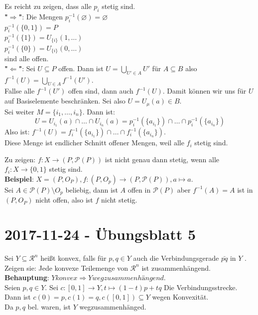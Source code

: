\begin{problem*}[3a]
Es reicht zu zeigen, dass alle $p_i$ stetig sind.\\
\textbf{"$\Rightarrow$"}: Die Mengen $p_i^{-1}(\varnothing) = \varnothing$\\
 $ p_i^{-1}( \{ 0,1 \}) = P$\\
$p_i^{-1}(\{ 1 \}) = U_{\{ i \}}(1,\dots)$\\ 
$ p_i^{-1}(\{ 0 \}) = U_{\{ i \}}(0,\dots)$\\
sind alle offen.\\
\textbf{"$\Leftarrow$"}: Sei $ U \subseteq P$ offen. Dann ist $U = \bigcup_{ U' \in A }U'$ für $ A \subseteq B$ also $f^{-1}(U) = \bigcup_{U \in A} f^{-1}(U')$. \\
Fallse alle $f^{-1}(U')$ offen sind, dann auch $ f^{-1}(U) $. Damit können wir uns für $U$ auf Basiselemente beschränken. Sei also $ U = U_\mu(a) \in B$.\\
Sei weiter $M = \{ i_1, \dots,i_n \}$. Dann ist:
\begin{equation*}
    U = U_{i_1}(a)\cap \dots \cap U_{i_n}(a) = p_i^{-1}(\{ a_{i_1} \}) \cap \dots \cap p_i^{-1}(\{ a_{i_n} \})
\end{equation*}
Also ist: $f^{-1}(U) = f_i^{-1}(\{ a_{i_1} \}) \cap \dots \cap f_i^{-1}(\{ a_{i_n} \}) $.\\
Diese Menge ist endlicher Schnitt offener Mengen, weil alle $f_i$ stetig sind.
\end{problem*}

\begin{problem*}[3b]
Zu zeigen: $f: X \to (P,\mathcal{P}(P))$ ist nicht genau dann stetig, wenn alle $f_i: X \to \{ 0,1 \}$ stetig sind.\\
\textbf{Beispiel}: $X = (P, O_P), f: (P, O_p) \to (P, \mathcal{P}(P)), a \mapsto a$.\\
Sei $ A \in \mathcal{P}(P) \setminus O_p$ beliebig, dann ist $ A $ offen in $\mathcal{P}(P)$ aber 
$f^{-1}(A) = A$ ist in $(P, O_P)$ nicht offen, also ist $f$ nicht stetig.
\end{problem*}


\section{2017-11-24 - Übungsblatt 5}


\begin{problem*}[1a]

Sei $ Y \subseteq \mathcal{R}^n$ heißt konvex, falls für $p, q \in Y$ auch die Verbindungsgerade $\bar{pq}$ in $Y$
.\\
Zeigen sie: Jede konvexe Teilemenge von $ \mathcal{R}^n$ ist zusammenhängend. \\
\textbf{Behauptung}: $Y konvex \Rightarrow Y wegzusammenhängend.$\\
Seien $p, q \in Y.$ Sei $c: [0,1] \to Y, t \mapsto (1-t)p +tq $ Die Verbindungsstrecke.
Dann ist $ c(0) = p, c(1) = q, c([0,1]) \subseteq Y$ wegen Konvexität. \\
Da $ p,q $ bel. waren, ist $ Y $ wegzusammenhänged. 
\end{problem*}

